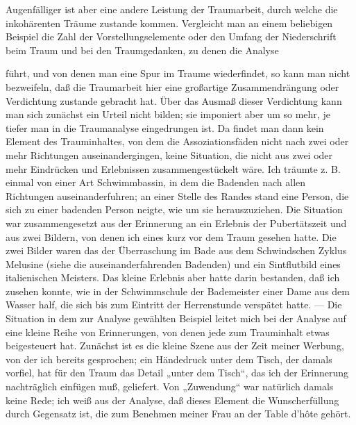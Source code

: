 \documentclass[twoside=true,titlepage=false,open=any, parskip=never, fontsize=10pt, headings=small, chapterprefix=false, appendixprefix=false]{scrbook}
\begin{document}
            
        \pstart
        Augenfälliger ist aber eine andere Leistung der Traumarbeit, durch welche die
               inkohärenten Träume zustande kommen. Vergleicht man an einem
               beliebigen Beispiel die Zahl der Vorstellungselemente oder den Umfang
               der Niederschrift beim Traum und bei den Traumgedanken, zu denen die Analyse
        \pend
    
         
            
            
            
        \pstart
        führt, und von denen man eine Spur im Traume wiederfindet, so kann
               man nicht bezweifeln, daß die Traumarbeit hier eine großartige Zusammendrängung
               oder Verdichtung zustande gebracht hat. Über das
               Ausmaß dieser Verdichtung kann man sich zunächst ein Urteil nicht bilden; sie
               imponiert aber um so mehr, je tiefer man in die Traumanalyse eingedrungen ist.
               Da findet man dann kein Element des Trauminhaltes, von dem die
               Assoziationsfäden nicht nach zwei oder mehr Richtungen auseinandergingen, keine Situation, die nicht aus zwei oder mehr Eindrücken und
               Erlebnissen zusammengestückelt wäre. Ich träumte z. B. einmal von einer Art
               Schwimmbassin, in dem die Badenden nach allen Richtungen auseinanderfuhren; an
               einer Stelle des Randes stand eine Person, die sich zu einer badenden
               Person neigte, wie um sie herauszuziehen. Die Situation war zusammengesetzt aus
               der Erinnerung an ein Erlebnis der Pubertätszeit und aus zwei
               Bildern, von denen ich eines kurz vor dem Traum gesehen hatte. Die zwei Bilder
               waren das der Überraschung im Bade aus dem Schwindschen Zyklus Melusine (siehe die
               auseinanderfahrenden Badenden) und ein Sintflutbild eines italienischen
               Meisters. Das kleine Erlebnis aber hatte darin bestanden, daß ich zusehen
               konnte, wie in der Schwimmschule der Bademeister einer Dame aus dem Wasser half,
               die sich bis zum Eintritt der Herrenstunde verspätet hatte. — Die Situation
               in dem zur Analyse gewählten Beispiel leitet mich bei der Analyse auf
               eine kleine Reihe von Erinnerungen, von denen jede zum Trauminhalt etwas
               beigesteuert hat. Zunächst ist es die kleine Szene aus der Zeit meiner Werbung,
               von der ich bereits gesprochen; ein Händedruck unter dem Tisch, der damals
               vorfiel, hat für den Traum das Detail „unter dem Tisch“, das ich der
               Erinnerung nachträglich einfügen muß, geliefert. Von „Zuwendung“ war
               natürlich damals keine Rede; ich weiß aus der Analyse, daß dieses
               Element die Wunscherfüllung durch Gegensatz ist, die zum Benehmen meiner Frau an
               der Table d’hôte gehört.
        \pend
    
\end{document}
